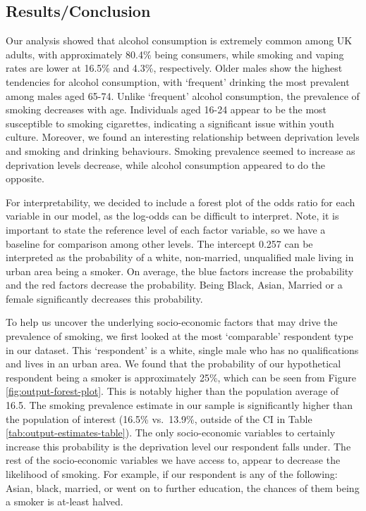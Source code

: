 \documentclass[
  11pt,
  twocolumn]{article}
\begin{document}
\hypertarget{resultsconclusion}{%
\subsection{Results/Conclusion}\label{resultsconclusion}}

Our analysis showed that alcohol consumption is extremely common among
UK adults, with approximately 80.4\% being consumers, while smoking and
vaping rates are lower at 16.5\% and 4.3\%, respectively. Older males
show the highest tendencies for alcohol consumption, with `frequent'
drinking the most prevalent among males aged 65-74. Unlike `frequent'
alcohol consumption, the prevalence of smoking decreases with age.
Individuals aged 16-24 appear to be the most susceptible to smoking
cigarettes, indicating a significant issue within youth culture.
Moreover, we found an interesting relationship between deprivation
levels and smoking and drinking behaviours. Smoking prevalence seemed to
increase as deprivation levels decrease, while alcohol consumption
appeared to do the opposite.

For interpretability, we decided to include a forest plot of the odds
ratio for each variable in our model, as the log-odds can be difficult
to interpret. Note, it is important to state the reference level of each
factor variable, so we have a baseline for comparison among other
levels. The intercept 0.257 can be interpreted as the probability of a
white, non-married, unqualified male living in urban area being a
smoker. On average, the blue factors increase the probability and the
red factors decrease the probability. Being Black, Asian, Married or a
female significantly decreases this probability.

To help us uncover the underlying socio-economic factors that may drive
the prevalence of smoking, we first looked at the most `comparable'
respondent type in our dataset. This `respondent' is a white, single
male who has no qualifications and lives in an urban area. We found that
the probability of our hypothetical respondent being a smoker is
approximately 25\%, which can be seen from Figure
\ref{fig:output-forest-plot}. This is notably higher than the population
average of 16.5. The smoking prevalence estimate in our sample is
significantly higher than the population of interest (16.5\% vs.~13.9\%,
outside of the CI in Table \ref{tab:output-estimates-table}). The only
socio-economic variables to certainly increase this probability is the
deprivation level our respondent falls under. The rest of the
socio-economic variables we have access to, appear to decrease the
likelihood of smoking. For example, if our respondent is any of the
following: Asian, black, married, or went on to further education, the
chances of them being a smoker is at-least halved.
\end{document}
